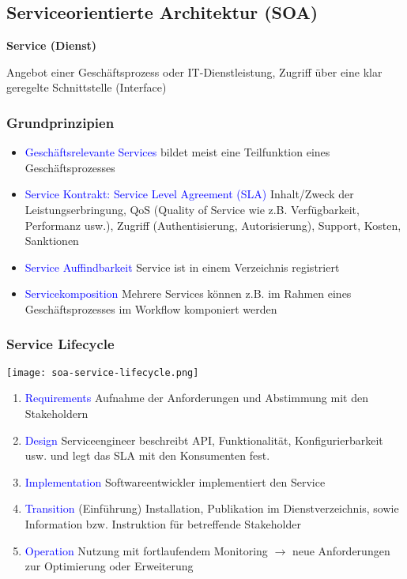 \subsection{Serviceorientierte Architektur (SOA)}

\textbf{Service (Dienst)}

Angebot einer Geschäftsprozess oder IT-Dienstleistung, Zugriff über eine klar geregelte Schnittstelle (Interface)

\subsubsection{Grundprinzipien}

\begin{itemize}
    \item \textcolor{blue}{Geschäftsrelevante Services} bildet meist eine Teilfunktion eines Geschäftsprozesses
    \item \textcolor{blue}{Service Kontrakt: Service Level Agreement (SLA)} Inhalt/Zweck der Leistungserbringung, QoS (Quality of Service wie z.B. Verfügbarkeit, Performanz usw.), Zugriff (Authentisierung, Autorisierung), Support, Kosten, Sanktionen
    \item \textcolor{blue}{Service Auffindbarkeit} Service ist in einem Verzeichnis registriert
    \item \textcolor{blue}{Servicekomposition} Mehrere Services können z.B. im Rahmen eines Geschäftsprozesses im Workflow komponiert werden
\end{itemize}

\subsubsection{Service Lifecycle}

\texttt{[image: soa-service-lifecycle.png]}

\begin{enumerate}
    \item \textcolor{blue}{Requirements} Aufnahme der Anforderungen
    und Abstimmung mit den Stakeholdern
    \item \textcolor{blue}{Design} Serviceengineer beschreibt API, Funktionalität, Konfigurierbarkeit usw. und legt das SLA mit den Konsumenten fest.
    \item \textcolor{blue}{Implementation} Softwareentwickler implementiert den Service
    \item \textcolor{blue}{Transition} (Einführung) Installation, Publikation im Dienstverzeichnis, sowie Information bzw. Instruktion für betreffende Stakeholder
    \item \textcolor{blue}{Operation} Nutzung mit fortlaufendem Monitoring $\rightarrow$ neue Anforderungen zur Optimierung oder Erweiterung
\end{enumerate}

